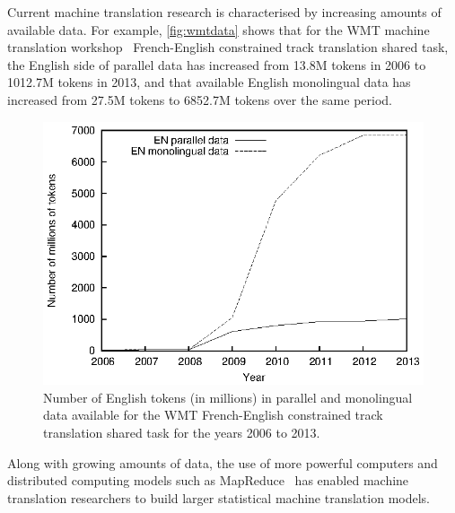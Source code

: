 Current machine translation research is characterised by increasing amounts
of available data. For example, \autoref{fig:wmtdata} shows that
for the WMT machine translation
workshop~\citep{bojar-buck-callisonburch-federmann-haddow-koehn-monz-post-soricut-specia:2013:WMT}
French-English constrained track translation shared task, the English side of parallel
data has increased from 13.8M tokens in 2006 to 1012.7M tokens in 2013, and that
available English monolingual data has increased from 27.5M tokens to 6852.7M
tokens over the same period.
%
\begin{figure}
  \begin{center}
    \includegraphics{figures/wmt/wmtdata.eps}
    \caption{Number of English tokens (in millions) in parallel and monolingual
      data available for the WMT French-English constrained track translation
      shared task for the years 2006 to 2013.}
    \label{fig:wmtdata}
  \end{center}
\end{figure}
%
Along with growing amounts of data, the use of more powerful computers
and distributed computing models such as
MapReduce~\citep{dean-ghemawat:2008:ACM,lin-dyer:2010:book} has enabled machine %
translation researchers to build larger statistical machine translation models.
%

